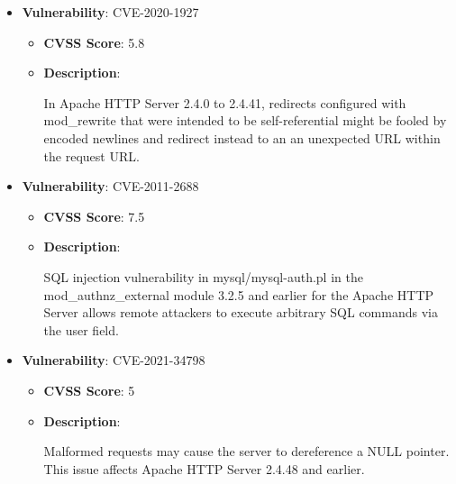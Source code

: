 \documentclass{article}
\begin{document}
\begin{itemize}
        \item \textbf{Vulnerability}: CVE-2020-1927
        \begin{itemize}
            \item \textbf{CVSS Score}:  5.8 
            \item \textbf{Description}:
            \parbox[t]{0.9\linewidth}{
                \ttfamily In Apache HTTP Server 2.4.0 to 2.4.41, redirects configured with mod\_rewrite that were intended to be self-referential might be fooled by encoded newlines and redirect instead to an an unexpected URL within the request URL.
            }
        \end{itemize}
    
        \item \textbf{Vulnerability}: CVE-2011-2688
        \begin{itemize}
            \item \textbf{CVSS Score}:  7.5 
            \item \textbf{Description}:
            \parbox[t]{0.9\linewidth}{
                \ttfamily SQL injection vulnerability in mysql/mysql-auth.pl in the mod\_authnz\_external module 3.2.5 and earlier for the Apache HTTP Server allows remote attackers to execute arbitrary SQL commands via the user field.
            }
        \end{itemize}
    
        \item \textbf{Vulnerability}: CVE-2021-34798
        \begin{itemize}
            \item \textbf{CVSS Score}:  5 
            \item \textbf{Description}:
            \parbox[t]{0.9\linewidth}{
                \ttfamily Malformed requests may cause the server to dereference a NULL pointer. This issue affects Apache HTTP Server 2.4.48 and earlier.
            }
        \end{itemize}
    

\end{itemize}
\end{document}

